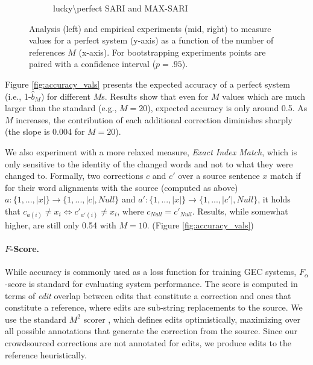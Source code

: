 \documentclass[a4paper]{article}
\begin{document}
\begin{figure}
\begin{subfigure}[]{0.65\columnwidth}
		\caption{
			lucky\textbackslash perfect SARI and MAX-SARI\label{fig:SARI_Ms}}
	\end{subfigure}
	\caption{Analysis (left) and empirical experiments (mid, right) to measure values for a perfect system (y-axis)
		as a function of the number of references $M$ (x-axis). For bootstrapping experiments points are paired with a confidence interval ($p=.95$).}
\end{figure}

Figure \ref{fig:accuracy_vals} presents the expected accuracy of a perfect
system (i.e., 1-$\hat{b}_M$) for different  $M$s. 
Results show that even for $M$ values which are much larger than the standard (e.g., $M=20$),
expected accuracy is only around 0.5. As $M$ increases, the contribution of each additional correction 
diminishes sharply (the slope is 0.004 for $M=20$).

We also experiment with a more relaxed measure, {\it Exact Index Match}, which is only sensitive to the identity of the changed words and not to what they were changed to. 
Formally, two corrections $c$ and $c'$ over a source sentence $x$ match if for their word alignments with the source (computed as above) $a:\{1,...,\left|x\right|\} \rightarrow \{1,...,\left|c\right|,Null\}$
and $a':\{1,...,\left|x\right|\} \rightarrow \{1,...,\left|c'\right|,Null\}$, it holds that $c_{a\left(i\right)} \neq x_{i} \Leftrightarrow c'_{a'\left(i\right)} \neq x_{i}$, where $c_{Null}=c'_{Null}$.
Results, while somewhat higher, are still only 0.54 with $M=10$. (Figure \ref{fig:accuracy_vals})

\paragraph{$F$-Score.}
While accuracy is commonly used as a loss function for training GEC systems,
$F_\alpha$-score is standard for evaluating system performance.
The score is computed in terms of {\it edit} overlap between edits that constitute a correction and ones that constitute a reference, where edits are sub-string replacements to the source.
We use the standard $M^2$ scorer \cite{dahlmeier2012better}, which defines edits optimistically, maximizing over all possible annotations that generate the correction 
from the source. Since our crowdsourced corrections are not annotated for edits, we produce edits to the reference heuristically.
\end{document}
